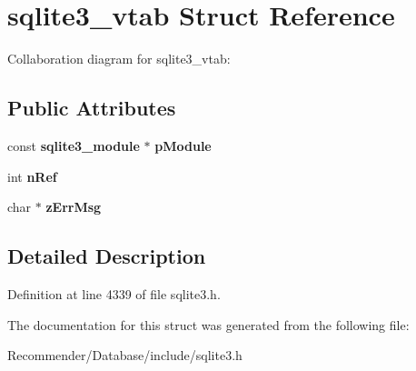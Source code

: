 \section{sqlite3\_\-vtab Struct Reference}
\label{structsqlite3__vtab}
Collaboration diagram for sqlite3\_\-vtab:\subsection*{Public Attributes}
\begin{CompactItemize}
\item 
const {\bf sqlite3\_\-module} $\ast$ {\bf pModule}\label{structsqlite3__vtab_71395f3913bd3f44e7c72118b1728f7d}

\item 
int {\bf nRef}\label{structsqlite3__vtab_3c459f9ae278c22b72583c55ca01acb7}

\item 
char $\ast$ {\bf zErrMsg}\label{structsqlite3__vtab_6fcf95fd4e53f09793171bd5b704ac9a}

\end{CompactItemize}


\subsection{Detailed Description}




Definition at line 4339 of file sqlite3.h.

The documentation for this struct was generated from the following file:\begin{CompactItemize}
\item 
Recommender/Database/include/sqlite3.h\end{CompactItemize}
